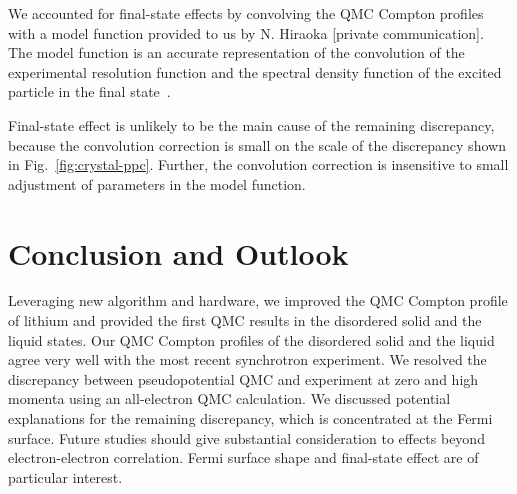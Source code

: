 \documentclass[aps,prb,showpacs,preprintnumbers,amsmath,amssymb,superscriptaddress,twocolumn]{revtex4}
\begin{document}
We accounted for final-state effects by convolving the QMC Compton profiles with a model function provided to us by N. Hiraoka [private communication]. The model function is an accurate representation of the convolution of the experimental resolution function and the spectral density function of the excited particle in the final state~\cite{Soininen2001}.

Final-state effect is unlikely to be the main cause of the remaining discrepancy, because the convolution correction is small on the scale of the discrepancy shown in Fig.~\ref{fig:crystal-ppc}. Further, the convolution correction is insensitive to small adjustment of parameters in the model function.



\section{Conclusion and Outlook}

Leveraging new algorithm and hardware, we improved the QMC Compton profile of lithium and provided the first QMC results in the disordered solid and the liquid states. Our QMC Compton profiles of the disordered solid and the liquid agree very well with the most recent synchrotron experiment. We resolved the discrepancy between pseudopotential QMC and experiment at zero and high momenta using an all-electron QMC calculation. We discussed potential explanations for the remaining discrepancy, which is concentrated at the Fermi surface. Future studies should give substantial consideration to effects beyond electron-electron correlation. Fermi surface shape and final-state effect are of particular interest.%
\end{document}
